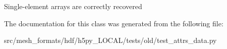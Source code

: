 \begin{DoxyVerb}Single-element arrays are correctly recovered \end{DoxyVerb}
 

The documentation for this class was generated from the following file\+:\begin{DoxyCompactItemize}
\item 
src/mesh\+\_\+formats/hdf/h5py\+\_\+\+L\+O\+C\+A\+L/tests/old/test\+\_\+attrs\+\_\+data.\+py\end{DoxyCompactItemize}
